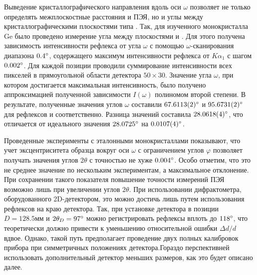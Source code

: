 Выведение кристаллографического направления вдоль оси $\omega$ позволяет не только определять межплоскостные расстояния и ПЭЯ, но и углы между кристаллографическими плоскостями типа \hkl[h 0 l].
Так, для изученного монокристалла Ge было проведено измерение угла между плоскостями \hkl[6 0 -10] и \hkl[10 0 -6].
Для этого получена зависимость интенсивности рефлекса от угла $\omega$ с помощью $\omega$-сканирования диапазона $0.4^\circ$, содержащего максимум интенсивности рефлекса от $K\alpha_1$ с шагом $0.002^\circ$.
Для каждой позиции проводили суммирование интенсивности всех пикселей в прямоугольной области детектора $50\times30$.
Значение угла $\omega$, при котором достигается максимальная интенсивность, было получено аппроксимацией полученной зависимости $I(\omega)$ полиномом второй степени.
В результате, полученные значения углов $\omega$ составили $67.6113 (2)^\circ$ и $95.6731 (2)^\circ$ для рефлексов \hkl[6 0 -10] и \hkl[10 0 -6] соответственно.
Разница значений составила $28.0618 (4)^\circ$, что отличается от идеального значения $28.0725^\circ$ на $0.0107 (4)^\circ$.

Проведенные эксперименты с эталонными монокристаллами показывают, что учет эксцентриситета образца вокруг оси $\omega$ с ограничением углов $\varphi$ позволяет получать значения углов $2\theta$ с точностью не хуже $0.004^\circ$.
Особо отметим, что это не среднее значение по нескольким экспериментам, а максимальное отклонение.
При сохранении такого показателя повышение точности измерений ПЭЯ возможно лишь при увеличении углов $2\theta$.
При использовании дифрактометра, оборудованного 2D-детектором, это можно достичь лишь путем использования рефлексов на краю детектора.
Так, при установке детектора в позиции $D = 128.5\unit{мм}$ и $2\theta_D = 97^\circ$ можно регистрировать рефлексы вплоть до $118^\circ$, что теоретически должно привести к уменьшению относительной ошибки $\Delta d / d$ вдвое.
Однако, такой путь предполагает проведение двух полных калибровок прибора при симметричных положениях детектора.Гораздо перспективней использовать дополнительный детектор меньших размеров, как это будет описано далее.

